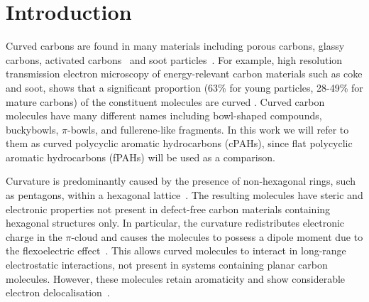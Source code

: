 %
\section{Introduction}
\label{sec:Introduction}

Curved carbons are found in many materials including porous carbons, glassy carbons, activated carbons~\cite{Harris2005new,Martin2019topology,Martin2019nanostructure} and soot particles~\cite{Martin2018flexo}. For example, high resolution transmission electron microscopy of energy-relevant carbon materials such as coke and soot, shows that a significant proportion (63\% for young particles, 28-49\% for mature carbons) of the constituent molecules are curved \cite{wang2017improved,zhong2018structural,Martin2018flexo}. 
Curved carbon molecules have many different names including bowl-shaped compounds, buckybowls, $\pi$-bowls, and fullerene-like fragments. In this work we will refer to them as curved polycyclic aromatic hydrocarbons (cPAHs), since flat polycyclic aromatic hydrocarbons (fPAHs) will be used as a comparison.

Curvature is predominantly caused by the presence of non-hexagonal rings, such as pentagons, within a hexagonal lattice~\cite{Martin2018polar}. The resulting molecules have steric and electronic properties not present in defect-free carbon materials containing hexagonal structures only. In particular, the curvature redistributes electronic charge in the $\pi$-cloud and causes the molecules to possess a dipole moment due to the flexoelectric effect~\cite{Martin2017}. This allows curved molecules to interact in long-range electrostatic interactions, not present in systems containing planar carbon molecules. However, these molecules retain aromaticity and show considerable electron delocalisation~\cite{grabowsky2010electron,Dobrowolski2011aromatic}.

